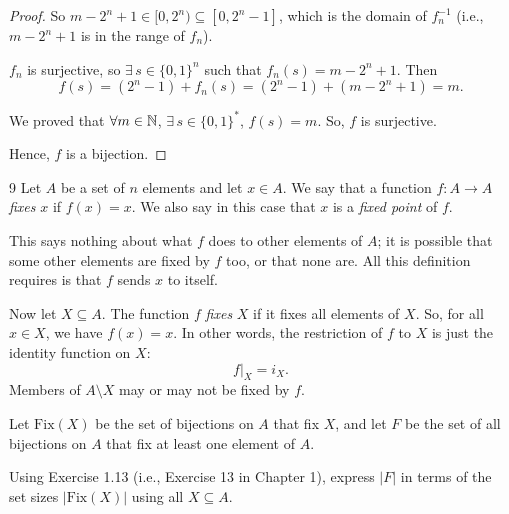 \documentclass[11pt]{article}
\begin{document}
\begin{solution}[(a)]
\begin{proof}
    So $m-2^n+1 \in [0,2^n) \subseteq [0,2^n-1]$, which is the domain of
    $f_n^{-1}$ (i.e., $m-2^n+1$ is in the range of $f_n$).

    $f_n$ is surjective, so $\exists\, s\in\{0,1\}^n$ such that
    $f_n(s) = m-2^n+1$. Then
    \[
        f(s) = (2^n-1) + f_n(s) = (2^n-1) + (m-2^n+1) = m.
    \]

    We proved that $\forall m\in\mathbb{N}$, $\exists\, s\in\{0,1\}^*$, $f(s)=m$.
    So, $f$ is surjective.

    Hence, $f$ is a bijection.
\end{proof}

\end{solution}

\begin{exercise}{9}
    Let $A$ be a set of $n$ elements and let $x\in A$. We say that a
    function $f: A\to A$ \emph{fixes} $x$ if $f(x)=x$. We also say in
    this case that $x$ is a \emph{fixed point} of $f$.

    This says nothing about what $f$ does to other elements of $A$;
    it is possible that some other elements are fixed by $f$ too, or
    that none are. All this definition requires is that $f$ sends
    $x$ to itself.

    Now let $X\subseteq A$. The function $f$ \emph{fixes} $X$ if it
    fixes all elements of $X$. So, for all $x\in X$, we have
    $f(x)=x$. In other words, the restriction of $f$ to $X$ is just
    the identity function on $X$:
    \[
        f|_X = i_X.
    \]
    Members of $A\setminus X$ may or may not be fixed by $f$.

    Let $\mathrm{Fix}(X)$ be the set of bijections on $A$ that fix
    $X$, and let $F$ be the set of all bijections on $A$ that fix at
    least one element of $A$.

    Using Exercise 1.13 (i.e., Exercise 13 in Chapter 1), express
    $|F|$ in terms of the set sizes $|\mathrm{Fix}(X)|$ using all
    $X\subseteq A$.
\end{exercise}
\begin{solution}

\end{solution}
\end{document}
